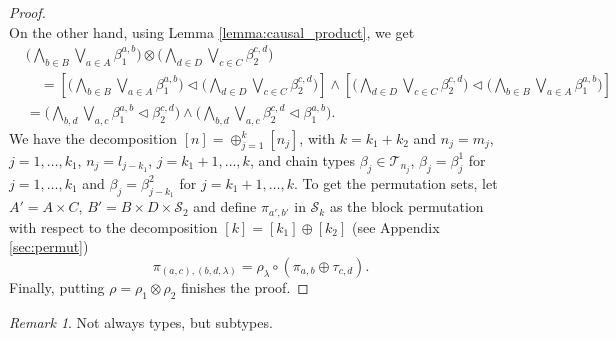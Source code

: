 \documentclass[12pt]{article}
\theoremstyle{definition}
\theoremstyle{remark}
\newtheorem{remark}{Remark}
\def\Te{\mathcal T}
\def\permut{\mathscr{S}}
\def\vtl{\vartriangleleft}
\begin{document}
\begin{proof}
\[\]
On the other hand, using Lemma \ref{lemma:causal_product}, we
get
\begin{align*}
&\bigl(\bigwedge_{b\in B}\bigvee_{a\in A}\beta_1^{a,b}\bigr)\otimes \bigl(\bigwedge_{d\in D}\bigvee_{c\in
C}\beta_2^{c,d}\bigr)\\
&\quad =\left[\bigl(\bigwedge_{b\in B}\bigvee_{a\in A}\beta_1^{a,b}\bigr)\vtl \bigl(\bigwedge_{d\in D}\bigvee_{c\in
C}\beta_2^{c,d}\bigr)\right]\wedge \left[\bigl(\bigwedge_{d\in D}\bigvee_{c\in
C}\beta_2^{c,d}\bigr)\vtl\bigl(\bigwedge_{b\in B}\bigvee_{a\in A}\beta_1^{a,b}\bigr)
\right]\\
&= \bigl(\bigwedge_{b,d}\bigvee_{a,c} \beta_1^{a,b}\vtl \beta_2^{c,d}\bigr) \wedge
\bigl(\bigwedge_{b,d}\bigvee_{a,c} \beta_2^{c,d}\vtl \beta_1^{a,b}\bigr).
\end{align*}
We have the decomposition $[n]=\oplus_{j=1}^k[n_j]$, with $k=k_1+k_2$ and $n_j=m_j$,
$j=1,\dots, k_1$,  $n_j=l_{j-k_1}$, $j=k_1+1,\dots,k$, and chain types $\beta_j\in
\Te_{n_j}$, $\beta_j=\beta_j^1$ for $j=1,\dots,k_1$ and $\beta_j=\beta^2_{j-k_1}$ for
$j=k_1+1,\dots,k$. To get the permutation sets, let $A'=A\times C$, $B'=B\times D\times
\permut_2$ and define $\pi_{a',b'}$ in $\permut_k$ as the block permutation with respect to the
decomposition $[k]=[k_1]\oplus[k_2]$ (see Appendix \ref{sec:permut})
\[
\pi_{(a,c),(b,d,\lambda)}=\rho_\lambda\circ(\pi_{a,b}\oplus \tau_{c,d}).
\]
Finally, putting $\rho=\rho_1\otimes\rho_2$ finishes the proof.

\end{proof}


\begin{remark} Not always types, but subtypes.

\end{remark}
\end{document}
